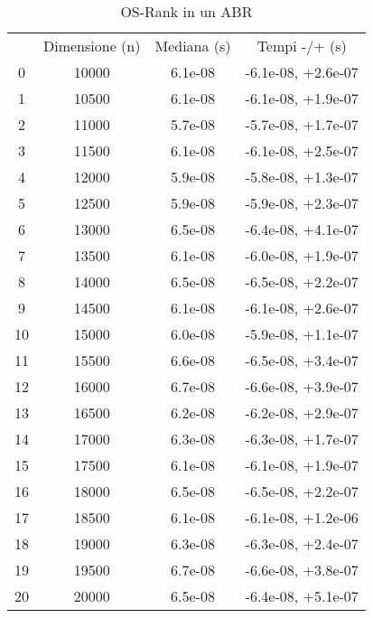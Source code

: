 \begin{table}
\centering
\caption{OS-Rank in un ABR}
\label{OS-Rank in un ABR}
\begin{adjustbox}{width=1\textwidth/2}
\begin{tabular}{|c|c|c|c|}
\hline
 & Dimensione (n) & Mediana (s) & Tempi -/+ (s) \\
0 & 10000 & 6.1e-08 & -6.1e-08, +2.6e-07 \\
\cline{1-4}
1 & 10500 & 6.1e-08 & -6.1e-08, +1.9e-07 \\
\cline{1-4}
2 & 11000 & 5.7e-08 & -5.7e-08, +1.7e-07 \\
\cline{1-4}
3 & 11500 & 6.1e-08 & -6.1e-08, +2.5e-07 \\
\cline{1-4}
4 & 12000 & 5.9e-08 & -5.8e-08, +1.3e-07 \\
\cline{1-4}
5 & 12500 & 5.9e-08 & -5.9e-08, +2.3e-07 \\
\cline{1-4}
6 & 13000 & 6.5e-08 & -6.4e-08, +4.1e-07 \\
\cline{1-4}
7 & 13500 & 6.1e-08 & -6.0e-08, +1.9e-07 \\
\cline{1-4}
8 & 14000 & 6.5e-08 & -6.5e-08, +2.2e-07 \\
\cline{1-4}
9 & 14500 & 6.1e-08 & -6.1e-08, +2.6e-07 \\
\cline{1-4}
10 & 15000 & 6.0e-08 & -5.9e-08, +1.1e-07 \\
\cline{1-4}
11 & 15500 & 6.6e-08 & -6.5e-08, +3.4e-07 \\
\cline{1-4}
12 & 16000 & 6.7e-08 & -6.6e-08, +3.9e-07 \\
\cline{1-4}
13 & 16500 & 6.2e-08 & -6.2e-08, +2.9e-07 \\
\cline{1-4}
14 & 17000 & 6.3e-08 & -6.3e-08, +1.7e-07 \\
\cline{1-4}
15 & 17500 & 6.1e-08 & -6.1e-08, +1.9e-07 \\
\cline{1-4}
16 & 18000 & 6.5e-08 & -6.5e-08, +2.2e-07 \\
\cline{1-4}
17 & 18500 & 6.1e-08 & -6.1e-08, +1.2e-06 \\
\cline{1-4}
18 & 19000 & 6.3e-08 & -6.3e-08, +2.4e-07 \\
\cline{1-4}
19 & 19500 & 6.7e-08 & -6.6e-08, +3.8e-07 \\
\cline{1-4}
20 & 20000 & 6.5e-08 & -6.4e-08, +5.1e-07 \\
\cline{1-4}
\end{tabular}
\end{adjustbox}
\end{table}
